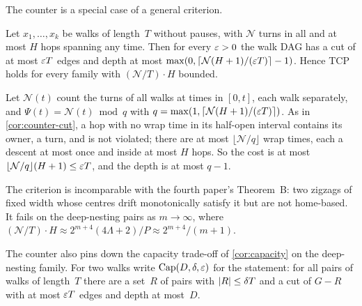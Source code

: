 The counter is a special case of a general criterion.

\begin{proposition}\label{prop:counter-criterion}
\notformalized
Let $x_1,\dots,x_k$ be walks of length~$T$ without pauses, with $\mathcal N$ turns in all and at most $H$ hops spanning any
time. Then for every $\varepsilon>0$ the walk DAG has a cut of at most $\varepsilon T$ edges and depth at most
$\max(0,\lceil\mathcal N(H+1)/(\varepsilon T)\rceil-1)$. Hence TCP holds for every family with $(\mathcal N/T)\cdot H$ bounded.
\end{proposition}

\begin{informalproof}
Let $\mathcal N(t)$ count the turns of all walks at times in $[0,t]$, each walk separately, and $\Psi(t)=\mathcal N(t)\bmod q$
with $q=\max(1,\lceil\mathcal N(H+1)/(\varepsilon T)\rceil)$. As in \cref{cor:counter-cut}, a hop with no wrap time in its
half-open interval contains its owner, a turn, and is not violated; there are at most $\lfloor\mathcal N/q\rfloor$ wrap
times, each a descent at most once and inside at most $H$ hops. So the cost is at most
$\lfloor\mathcal N/q\rfloor(H+1)\le\varepsilon T$, and the depth is at most $q-1$.
\end{informalproof}

The criterion is incomparable with the fourth paper's Theorem~B: two zigzags of fixed width whose centres drift
monotonically satisfy it but are not home-based. It fails on the deep-nesting pairs as $m\to\infty$, where
$(\mathcal N/T)\cdot H\approx2^{m+4}(4\Lambda+2)/P\approx2^{m+4}/(m+1)$.

The counter also pins down the capacity trade-off of \cref{cor:capacity} on the deep-nesting family. For two walks write
$\mathrm{Cap}(D,\delta,\varepsilon)$ for the statement: for all pairs of walks of length~$T$ there are a set~$R$ of pairs with
$\lvert R \rvert\le\delta T$ and a cut of $G-R$ with at most $\varepsilon T$ edges and depth at most~$D$.

